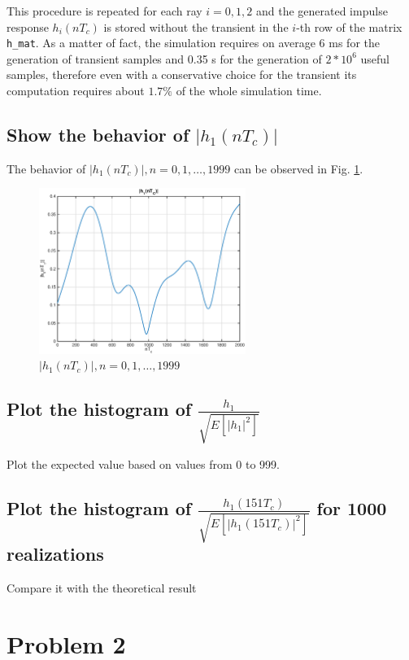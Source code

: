 \documentclass[10pt]{article}
\begin{document}
This procedure is repeated for each ray $i = 0, 1, 2$ and the generated impulse response $h_i(nT_c)$ is stored without the transient in the $i$-th row of the matrix \texttt{h\_mat}. As a matter of fact, the simulation requires on average 6 ms for the generation of transient samples and 0.35 s for the generation of $2*10^6$ useful samples, therefore even with a conservative choice for the transient its computation requires about $1.7\%$ of the whole simulation time.


\subsection*{Show the behavior of $|h_1(nT_c)|$}
The behavior of $|h_1(nT_c)|, n = 0, 1, \dots, 1999$ can be observed in Fig. \ref{fig:h1}.

\begin{figure}[h!]
  \centering
  \includegraphics[width = 0.6\textwidth]{p01_h1}
  \caption{$|h_1(nT_c)|, n = 0, 1, \dots, 1999$}
  \label{fig:h1}
\end{figure}

\subsection*{Plot the histogram of $\frac{h_1}{\sqrt{E[|h_1|^2]}}$}
Plot the expected value based on values from 0 to 999.

\subsection*{Plot the histogram of $\frac{h_1(151T_c)}{\sqrt{E[|h_1(151T_c)|^2]}}$ for 1000 realizations}
Compare it with the theoretical result

\section*{Problem 2}
\end{document}
